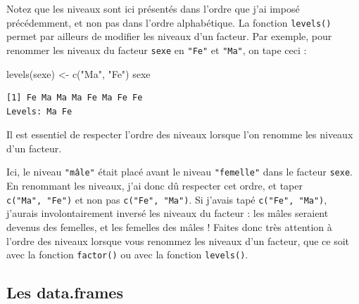 \documentclass[
  a4paper,
  DIV=11,
  numbers=noendperiod,
  oneside]{scrreprt}
\newenvironment{Shaded}{}{}
\newcommand{\FunctionTok}[1]{\textcolor[rgb]{0.44,0.26,0.76}{#1}}
\newcommand{\NormalTok}[1]{\textcolor[rgb]{0.14,0.16,0.18}{#1}}
\newcommand{\OtherTok}[1]{\textcolor[rgb]{0.44,0.26,0.76}{#1}}
\newcommand{\StringTok}[1]{\textcolor[rgb]{0.01,0.18,0.38}{#1}}
\begin{document}
Notez que les niveaux sont ici présentés dans l'ordre que j'ai imposé
précédemment, et non pas dans l'ordre alphabétique. La fonction
\texttt{levels()} permet par ailleurs de modifier les niveaux d'un
facteur. Par exemple, pour renommer les niveaux du facteur \texttt{sexe}
en \texttt{"Fe"} et \texttt{"Ma"}, on tape ceci :

\begin{Shaded}
\begin{Highlighting}[]
\FunctionTok{levels}\NormalTok{(sexe) }\OtherTok{\textless{}{-}} \FunctionTok{c}\NormalTok{(}\StringTok{"Ma"}\NormalTok{, }\StringTok{"Fe"}\NormalTok{)}
\NormalTok{sexe}
\end{Highlighting}
\end{Shaded}

\begin{verbatim}
[1] Fe Ma Ma Ma Fe Ma Fe Fe
Levels: Ma Fe
\end{verbatim}

\begin{tcolorbox}[enhanced jigsaw, coltitle=black, toprule=.15mm, opacityback=0, breakable, colback=white, opacitybacktitle=0.6, colframe=quarto-callout-important-color-frame, leftrule=.75mm, rightrule=.15mm, titlerule=0mm, bottomtitle=1mm, toptitle=1mm, arc=.35mm, title=\textcolor{quarto-callout-important-color}{\faExclamation}\hspace{0.5em}{Attention à l'ordre des niveaux !}, colbacktitle=quarto-callout-important-color!10!white, bottomrule=.15mm, left=2mm]

Il est essentiel de respecter {l'ordre des niveaux} lorsque l'on renomme
les niveaux d'un facteur.

Ici, le niveau \texttt{"mâle"} était placé avant le niveau
\texttt{"femelle"} dans le facteur \texttt{sexe}. En renommant les
niveaux, j'ai donc dû respecter cet ordre, et taper
\texttt{c("Ma",\ "Fe")} et non pas \texttt{c("Fe",\ "Ma")}. Si j'avais
tapé \texttt{c("Fe",\ "Ma")}, j'aurais involontairement inversé les
niveaux du facteur : les mâles seraient devenus des femelles, et les
femelles des mâles ! Faites donc très attention à l'ordre des niveaux
lorsque vous renommez les niveaux d'un facteur, que ce soit avec la
fonction \texttt{factor()} ou avec la fonction \texttt{levels()}.

\end{tcolorbox}

\subsection{Les data.frames}\label{sec-dataframe}
\end{document}
